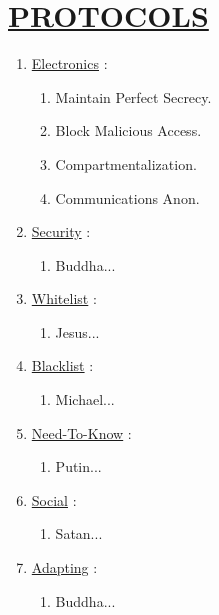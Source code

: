 \documentclass[11pt]{article}
\begin{document}
\section*{\ul{PROTOCOLS}}
\begin{enumerate}
	\item[] \ul{Electronics} :
	\begin{enumerate}
		\item[] Maintain Perfect Secrecy.
		\item[] Block Malicious Access.
		\item[] Compartmentalization.
		\item[] Communications Anon.
	\end{enumerate}

	\item[] \ul{Security} :
	\begin{enumerate}
		\item[] Buddha...
	\end{enumerate}

	\item[] \ul{Whitelist} :
	\begin{enumerate}
		\item[] Jesus...
	\end{enumerate}
	
	\item[] \ul{Blacklist} :
	\begin{enumerate}
		\item[] Michael...
	\end{enumerate}

	\item[] \ul{Need-To-Know} :
	\begin{enumerate}
		\item[] Putin...
	\end{enumerate}

	\item[] \ul{Social}  :
	\begin{enumerate}
		\item[] Satan...
	\end{enumerate}

	\item[] \ul{Adapting} :
	\begin{enumerate}
		\item[] Buddha...
	\end{enumerate}
\end{enumerate}
\end{document}
